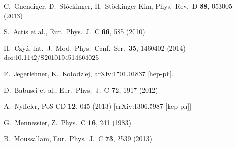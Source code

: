 \documentclass[epj,onecolumn]{webofc}
\begin{document}
\begin{thebibliography}{}
  C.~Gnendiger, D.~St\"ockinger, H.~St\"ockinger-Kim,
  Phys.\ Rev.\ D {\bf 88}, 053005 (2013)

  S.~Actis et al.,
  Eur.\ Phys.\ J.\ C {\bf 66}, 585 (2010)

  H.~Czy\.z,
  Int.\ J.\ Mod.\ Phys.\ Conf.\ Ser.\  {\bf 35}, 1460402 (2014)
  doi:10.1142/S2010194514604025

  F.~Jegerlehner, K.~Ko\l odziej,
  arXiv:1701.01837 [hep-ph].

  D.~Babusci et al.,
  Eur.\ Phys.\ J.\ C {\bf 72}, 1917 (2012)

  A.~Nyffeler,
  PoS CD {\bf 12}, 045 (2013)
  [arXiv:1306.5987 [hep-ph]]

  G.~Mennessier,
  Z.\ Phys.\ C {\bf 16}, 241 (1983)

  B.~Moussallam,
  Eur.\ Phys.\ J.\ C {\bf 73}, 2539 (2013)


\end{thebibliography}
\end{document}
